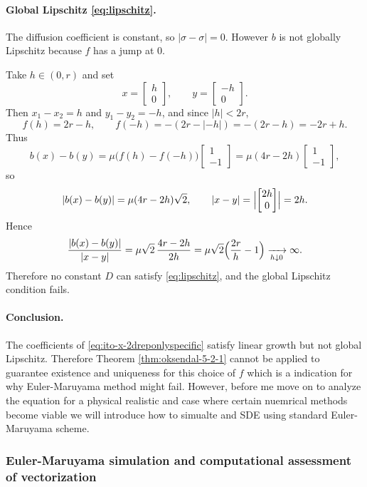 \documentclass[11pt]{article}
\newcommand{\1}{\mathbbm{1}}
\theoremstyle{plain}
\theoremstyle{definition}
\theoremstyle{remark}
\begin{document}
\paragraph{Global Lipschitz \eqref{eq:lipschitz}.}
The diffusion coefficient is constant, so $|\sigma-\sigma|=0$.
However $b$ is not globally Lipschitz because $f$ has a jump at $0$.

Take $h\in(0,r)$ and set
\[
x=\begin{bmatrix}h\\0\end{bmatrix},
\qquad
y=\begin{bmatrix}-h\\0\end{bmatrix}.
\]
Then $x_1-x_2=h$ and $y_1-y_2=-h$, and since $|h|<2r$,
\[
f(h)=2r-h,
\qquad
f(-h)=-(2r-|{-h}|)=-(2r-h)=-2r+h.
\]
Thus
\[
b(x)-b(y)
=
\mu\bigl(f(h)-f(-h)\bigr)\begin{bmatrix}1\\-1\end{bmatrix}
=
\mu(4r-2h)\begin{bmatrix}1\\-1\end{bmatrix},
\]
so
\[
|b(x)-b(y)|
=
\mu(4r-2h)\sqrt{2},
\qquad
|x-y|=\Bigl|\begin{bmatrix}2h\\0\end{bmatrix}\Bigr|=2h.
\]
Hence
\[
\frac{|b(x)-b(y)|}{|x-y|}
=
\mu\sqrt{2}\,\frac{4r-2h}{2h}
=
\mu\sqrt{2}\Bigl(\frac{2r}{h}-1\Bigr)\xrightarrow[h\downarrow 0]{}\infty.
\]
Therefore no constant $D$ can satisfy \eqref{eq:lipschitz}, and the global Lipschitz condition fails.

\paragraph{Conclusion.}
The coefficients of \eqref{eq:ito-x-2dreponlyspecific} satisfy linear growth but not global Lipschitz.
Therefore Theorem \ref{thm:oksendal-5-2-1} cannot be applied to guarantee existence and uniqueness for this choice of $f$ which is a indication for why Euler-Maruyama method might fail. However, before me move on to analyze the equation for a physical realistic and case where certain nuemrical methods become viable we will introduce how to simualte and SDE using standard Euler-Maruyama scheme.

\subsubsection{Euler-Maruyama simulation and computational assessment of vectorization}
\end{document}
